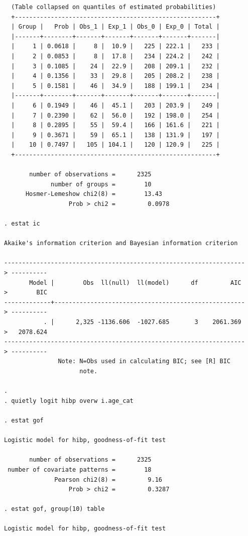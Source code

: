 \documentclass{article}
\begin{document}
\begin{enumerate}[a.]
\begin{verbatim}
  (Table collapsed on quantiles of estimated probabilities)
  +--------------------------------------------------------+
  | Group |   Prob | Obs_1 | Exp_1 | Obs_0 | Exp_0 | Total |
  |-------+--------+-------+-------+-------+-------+-------|
  |     1 | 0.0618 |     8 |  10.9 |   225 | 222.1 |   233 |
  |     2 | 0.0853 |     8 |  17.8 |   234 | 224.2 |   242 |
  |     3 | 0.1085 |    24 |  22.9 |   208 | 209.1 |   232 |
  |     4 | 0.1356 |    33 |  29.8 |   205 | 208.2 |   238 |
  |     5 | 0.1581 |    46 |  34.9 |   188 | 199.1 |   234 |
  |-------+--------+-------+-------+-------+-------+-------|
  |     6 | 0.1949 |    46 |  45.1 |   203 | 203.9 |   249 |
  |     7 | 0.2390 |    62 |  56.0 |   192 | 198.0 |   254 |
  |     8 | 0.2895 |    55 |  59.4 |   166 | 161.6 |   221 |
  |     9 | 0.3671 |    59 |  65.1 |   138 | 131.9 |   197 |
  |    10 | 0.7497 |   105 | 104.1 |   120 | 120.9 |   225 |
  +--------------------------------------------------------+

       number of observations =      2325
             number of groups =        10
      Hosmer-Lemeshow chi2(8) =        13.43
                  Prob > chi2 =         0.0978

. estat ic

Akaike's information criterion and Bayesian information criterion

-------------------------------------------------------------------
> ----------
       Model |        Obs  ll(null)  ll(model)      df         AIC 
>        BIC
-------------+-----------------------------------------------------
> ----------
           . |      2,325 -1136.606  -1027.685       3    2061.369 
>   2078.624
-------------------------------------------------------------------
> ----------
               Note: N=Obs used in calculating BIC; see [R] BIC
                     note.

. 
. quietly logit hibp overw i.age_cat

. estat gof

Logistic model for hibp, goodness-of-fit test

       number of observations =      2325
 number of covariate patterns =        18
              Pearson chi2(8) =         9.16
                  Prob > chi2 =         0.3287

. estat gof, group(10) table

Logistic model for hibp, goodness-of-fit test


\end{verbatim}
\end{enumerate}
\end{document}
